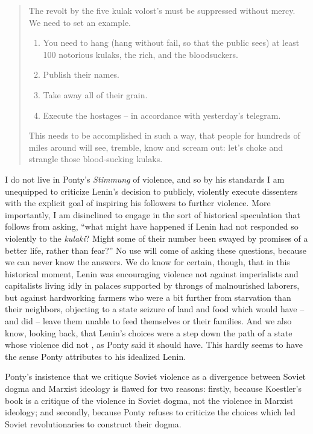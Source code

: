 \blockquote[{\cite{lenin}}]{The revolt by the five kulak volost's must be suppressed
without mercy. \textelp{} We need to set an example.

\begin{enumerate}
\item You need to hang (hang without fail, so that the public sees) at least 100 notorious
kulaks, the rich, and the bloodsuckers.

\item Publish their names.

\item Take away all of their grain.

\item Execute the hostages -- in accordance with yesterday's telegram.
\end{enumerate}

This needs to be accomplished in such a way, that people for hundreds of miles around will
see, tremble, know and scream out: let's choke and strangle those blood-sucking kulaks.}

I do not live in Ponty's \textit{Stimmung} of violence, and so by his standards I am
unequipped to criticize Lenin's decision to publicly, violently execute dissenters with
the explicit goal of inspiring his followers to further violence. More importantly, I am
disinclined to engage in the sort of historical speculation that follows from asking,
\enquote{what might have happened if Lenin had not responded so violently to the
\textit{kulaki}? Might some of their number been swayed by promises of a better life,
rather than fear?} No use will come of asking these questions, because we can never know
the answers. We do know for certain, though, that in this historical moment, Lenin was
encouraging violence not against imperialists and capitalists living idly in palaces
supported by throngs of malnourished laborers, but against hardworking farmers who were a
bit further from starvation than their neighbors, objecting to a state seizure of land and
food which would have -- and did -- leave them unable to feed themselves or their
families. And we also know, looking back, that Lenin's choices were a step down the path
of a state whose violence did not , as Ponty said it should have. This hardly seems to have the
sense Ponty attributes to his idealized Lenin.


Ponty's insistence that we critique Soviet violence as a divergence between Soviet dogma
and Marxist ideology is flawed for two reasons: firstly, because Koestler's book is a
critique of the violence in Soviet dogma, not the violence in Marxist ideology; and
secondly, because Ponty refuses to criticize the choices which led Soviet revolutionaries
to construct their dogma.
